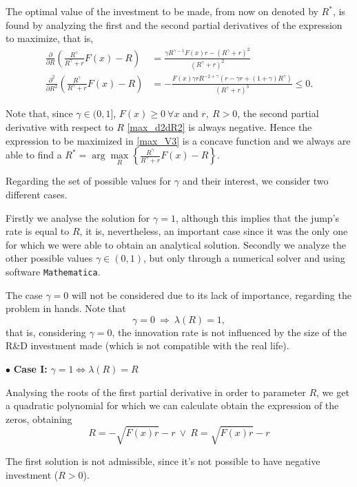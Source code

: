 The optimal value of the investment to be made, from now on denoted by $R^*$, is found by analyzing the first and the second partial derivatives of the expression to maximize, that is,
\begin{align}
\frac{\partial}{\partial R} \left( \frac{R^\gamma}{R^\gamma+r} F(x) -R \right) &= \frac{\gamma R^{\gamma-1}F(x)r-(R^\gamma+r)^2}{(R^\gamma+r)^2} \label{max_ddR}\\
\frac{\partial^2}{\partial R^2} \left( \frac{R^\gamma}{R^\gamma+r} F(x) -R \right) &=
-\frac{F(x) \gamma r R^{-2+\gamma}(r-\gamma r+(1+\gamma)R^\gamma)}{(R^\gamma+r)^3}\leq 0.
\label{max_d2dR2}
\end{align}

Note that, since $\gamma \in (0,1]$, $F(x)\geq0 \ \forall x$ and $r, \ R >0$, the second partial derivative with respect to $R$ \eqref{max_d2dR2} is always negative. Hence the expression to be maximized in \eqref{max_V3} is a concave function and we always are able to find a $R^*=\arg \underset{R}{\max} \left\{ \frac{R^\gamma}{R^\gamma+r} F(x) -R \right\}$.

Regarding the set of possible values for $\gamma$ and their interest, we consider two different cases.

Firstly we analyse the solution for $\gamma=1$, although this implies that the jump's rate is equal to $R$, it is, nevertheless, an important case since it was the only one for which we were able to obtain an analytical solution. Secondly we analyze the other possible values $\gamma \in (0,1)$, but only through a numerical solver and using software \texttt{Mathematica}.

The case $\gamma=0$ will not be considered due to its lack of importance, regarding the problem in hands. Note that $$\gamma=0 \ \Rightarrow \ \lambda(R)=1,$$
that is, considering $\gamma=0$, the innovation rate is not influenced by the size of the R\&D investment made (which is not compatible with the real life).

$\bullet$ \textbf{Case I:} $\gamma=1 \Leftrightarrow \lambda(R)=R$

Analysing the roots of the first partial derivative in order to parameter $R$, we get a quadratic polynomial for which we can calculate obtain the expression of the zeros, obtaining
$$  R=-\sqrt{F(x)r}-r \  \vee \ R=\sqrt{F(x)r}-r$$

The first solution is not admissible, since it's not possible to have negative investment ($R>0$).

